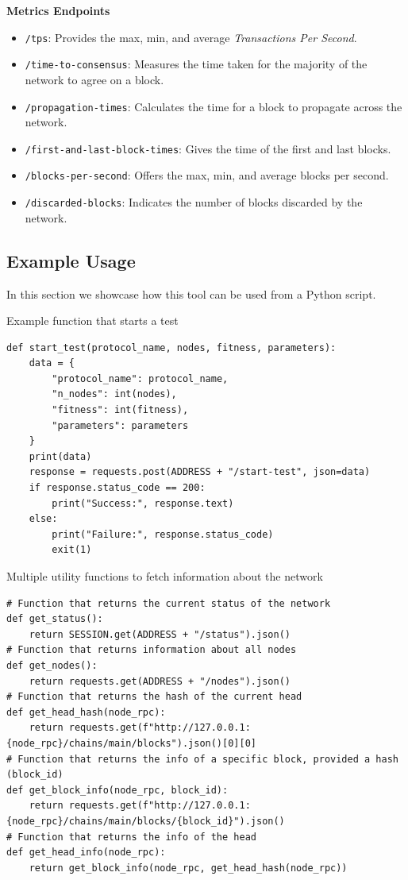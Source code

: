 \textbf{Metrics Endpoints}
\begin{itemize}
  \item \texttt{/tps}: Provides the max, min, and average \textit{Transactions Per Second}.
  \item \texttt{/time-to-consensus}: Measures the time taken for the majority of the network to agree on a block.
  \item \texttt{/propagation-times}: Calculates the time for a block to propagate across the network.
  \item \texttt{/first-and-last-block-times}: Gives the time of the first and last blocks.
  \item \texttt{/blocks-per-second}: Offers the max, min, and average blocks per second.
  \item \texttt{/discarded-blocks}: Indicates the number of blocks discarded by the network.
\end{itemize}


\subsection{Example Usage}

In this section we showcase how this tool can be used from a Python script.

\begin{listing}[H]
\caption{Example function that starts a test}
\label{lst:python_code}
\begin{verbatim}
def start_test(protocol_name, nodes, fitness, parameters):
    data = {
        "protocol_name": protocol_name,
        "n_nodes": int(nodes),
        "fitness": int(fitness),
        "parameters": parameters
    }
    print(data)
    response = requests.post(ADDRESS + "/start-test", json=data)
    if response.status_code == 200:
        print("Success:", response.text)
    else:
        print("Failure:", response.status_code)
        exit(1)
\end{verbatim}
\end{listing}

\begin{listing}[H]
\caption{Multiple utility functions to fetch information about the network}
\label{lst:python_code}
\begin{verbatim}
# Function that returns the current status of the network
def get_status():
    return SESSION.get(ADDRESS + "/status").json()
# Function that returns information about all nodes
def get_nodes():
    return requests.get(ADDRESS + "/nodes").json()
# Function that returns the hash of the current head
def get_head_hash(node_rpc):
    return requests.get(f"http://127.0.0.1:{node_rpc}/chains/main/blocks").json()[0][0]
# Function that returns the info of a specific block, provided a hash (block_id)
def get_block_info(node_rpc, block_id):
    return requests.get(f"http://127.0.0.1:{node_rpc}/chains/main/blocks/{block_id}").json()
# Function that returns the info of the head
def get_head_info(node_rpc):
    return get_block_info(node_rpc, get_head_hash(node_rpc))
\end{verbatim}
\end{listing}




